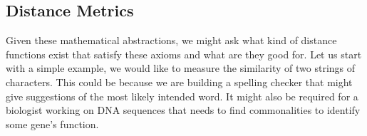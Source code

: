 \subsection{Distance Metrics}
Given these mathematical abstractions, we might ask what kind of distance functions exist that satisfy these axioms and what are they good for.  Let us start with a simple example, we would like to measure the similarity of two strings of characters.  This could be because we are building a spelling checker that might give suggestions of the most likely intended word.  It might also be required for a biologist working on DNA sequences that needs to find commonalities to identify some gene's function.
%
%
%
%
